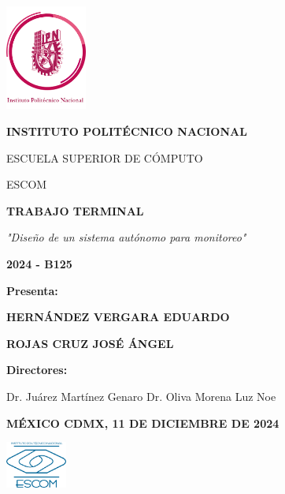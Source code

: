 \begin{titlepage}
    \centering
    \begin{flushleft}
        \includegraphics[width=0.2\textwidth]{./images/logos/logoIPN} \par
    \end{flushleft}
    \vspace{1cm}
    
    {\bfseries\Large INSTITUTO POLIT\'ECNICO NACIONAL \par}
    {\Large ESCUELA SUPERIOR DE C\'OMPUTO \par}
    {\Large ESCOM \par}
    \vspace{1cm}

    {\bfseries\Large TRABAJO TERMINAL \par}
    \vspace{0.5cm}
    {\itshape\large "Dise\~no de un sistema aut\'onomo para monitoreo" \par}
    \vspace{0.5cm}
    {\bfseries\large 2024 - B125 \par}
    \vspace{1cm}

    {\bfseries\large Presenta: \par}
    \vspace{0.5cm}
    {\bfseries\large HERN\'ANDEZ VERGARA EDUARDO \par}
    {\bfseries\large ROJAS CRUZ JOS\'E \'ANGEL \par}
    \vspace{1cm}

    {\bfseries\large Directores: \par}
    \vspace{0.5cm}
    Dr. Ju\'arez Mart\'inez Genaro \hfill Dr. Oliva Morena Luz Noe \par
    \vspace{1cm}

    {\bfseries\large M\'EXICO CDMX, 11 DE DICIEMBRE DE 2024 \par}
    \vfill %

    \begin{flushleft}
    \includegraphics[width=0.15\textwidth]{./images/logos/logoESCOM} \par
    \end{flushleft}
\end{titlepage}
